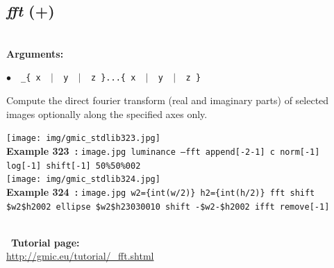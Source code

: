 \documentclass[a4paper,10.5pt,twoside]{book}
\def\comma{\discretionary{,}{}{,}}
\newcommand{\Cb}[1]{\textcolor{cb}{#1}}
\begin{document}
\subsection{\emph{fft} (+)}\vspace*{-0.7em}
~\\\textbf{\Cb{Arguments: }}\begin{flushleft}
{\small \Cb{\hspace*{0.5cm}$\bullet$~~\texttt{\_\{ x ~$|$~ y ~$|$~ z \}...\{ x ~$|$~ y ~$|$~ z \}}}}\end{flushleft}
Compute the direct fourier transform (real and imaginary parts) of selected images{\comma}
optionally along the specified axes only.
\begin{center}\texttt{[image: img/gmic\_stdlib323.jpg]}\\
{\footnotesize \textbf{Example 323~:} \texttt{image.jpg luminance --fft append[-2{\comma}-1] c norm[-1] log[-1] shift[-1] 50\%{\comma}50\%{\comma}0{\comma}0{\comma}2}}
\\\texttt{[image: img/gmic\_stdlib324.jpg]}\\
{\footnotesize \textbf{Example 324~:} \texttt{image.jpg w2=\{int(w/2)\} h2=\{int(h/2)\} fft shift \$w2{\comma}\$h2{\comma}0{\comma}0{\comma}2 ellipse \$w2{\comma}\$h2{\comma}30{\comma}30{\comma}0{\comma}1{\comma}0 shift -\$w2{\comma}-\$h2{\comma}0{\comma}0{\comma}2 ifft remove[-1]}}
\end{center}
~\\
~\textbf{Tutorial page: }\\\url{http://gmic.eu/tutorial/\_fft.shtml}
\end{document}
